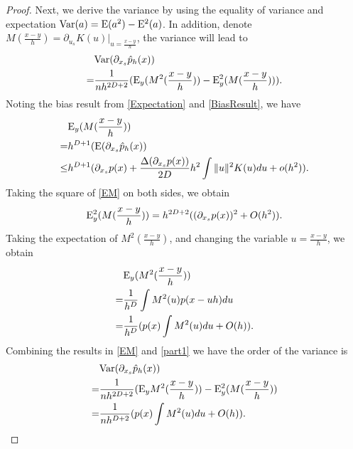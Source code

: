 \documentclass[aos,preprint]{imsart}
\theoremstyle{remark}
\begin{document}
\begin{appendix}
\begin{proof}
Next, we derive the variance by using the equality of variance and expectation ${\rm Var}(a) = {\rm E}(a^2)-{\rm E}^2(a)$.
In addition, denote $M(\frac{x-y}{h}) = \partial_ {u_s}  K(u)|_{u=\frac{x-y}{h}}$, the variance will lead to
\begin{equation}\label{e11}
\begin{aligned}
 &{\rm Var} (\partial_{x_s} \hat{p}_h(x))\\
  = &\frac{1}{nh^{2D+2}}({\rm E}_y (M^2(\frac{x-y}{h}))-{\rm E}^2_y(M(\frac{x-y}{h}))).
\end{aligned}
\end{equation}
Noting the bias result from \eqref{Expectation} and \eqref{BiasResult}, we have
\begin{equation}\label{EM}
\begin{aligned}
&{\rm E}_y(M(\frac{x-y}{h})) \\
= &h^{D+1} ( {\rm E}(\partial_{x_s} \hat{p}_h(x))\\
\leq &h^{D+1} (\partial_{x_s} p(x)+\frac{\Delta(\partial_{x_s}p(x))}{2D} h^2 \int \|u\|^2 K(u) du+o(h^2)).
\end{aligned}
\end{equation}
Taking the square of \eqref{EM} on both sides, we obtain
\[
{\rm E}^2_y(M(\frac{x-y}{h})) = h^{2D+2}((\partial_{x_s} p(x))^2+ O(h^2)).
\]
Taking the expectation of $M^2(\frac{x-y}{h})$, and changing the variable $u=\frac{x-y}{h}$, we obtain
\begin{equation}\label{part1}
\begin{aligned}
&{\rm E}_y(M^2(\frac{x-y}{h})) \\
=& \frac{1}{h^D} \int M^2(u) p(x-uh) du \\
= &\frac{1}{h^D}(p(x)\int M^2(u)du+O(h)).
\end{aligned}
\end{equation}
Combining the results in \eqref{EM} and \eqref{part1} we have the order of the variance is
\begin{equation}\label{Var}
\begin{aligned}
  & {\rm Var} (\partial_{x_s} \hat{p}_h(x))  \\
=& \frac{1}{n h^{2D+2}}({\rm E}_yM^2(\frac{x-y}{h}))-{\rm E}^2_y(M(\frac{x-y}{h})) \\
=& \frac{1}{n h^{D+2}} (p(x)\int M^2(u)du +O(h)).
\end{aligned}
\end{equation}

\end{proof}
\end{appendix}
\end{document}
